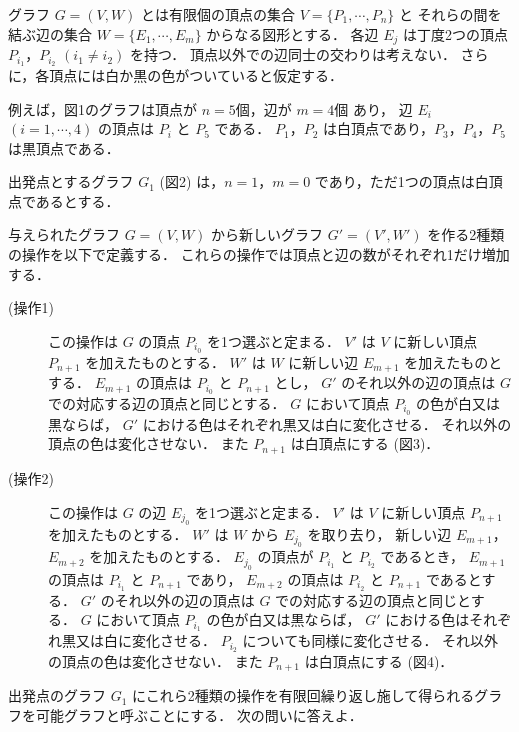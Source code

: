 \documentclass[../../main.tex]{subfiles}
\begin{document}
グラフ $G=(V,W)$ とは有限個の頂点の集合 $V=\{P_1,\cdots,P_n\}$ と
それらの間を結ぶ辺の集合 $W=\{E_1,\cdots,E_m\}$ からなる図形とする．
各辺 $E_j$ は丁度2つの頂点 $P_{i_1}$，$P_{i_2}$ $(i_1 \neq i_2)$ を持つ．
頂点以外での辺同士の交わりは考えない．
さらに，各頂点には白か黒の色がついていると仮定する．

例えば，図1のグラフは頂点が $n=5\text{個}$，辺が $m=4\text{個}$ あり，
辺 $E_i$ $(i=1,\cdots,4)$ の頂点は $P_i$ と $P_5$ である．
$P_1$，$P_2$ は白頂点であり，$P_3$，$P_4$，$P_5$ は黒頂点である．

出発点とするグラフ $G_1$ (図2) は，$n=1$，$m=0$ であり，ただ1つの頂点は白頂点であるとする．

与えられたグラフ $G=(V,W)$ から新しいグラフ $G'=(V',W')$ を作る2種類の操作を以下で定義する．
これらの操作では頂点と辺の数がそれぞれ1だけ増加する．

\begin{description}
  \item[(操作1)] この操作は $G$ の頂点 $P_{i_0}$ を1つ選ぶと定まる．
    $V'$ は $V$ に新しい頂点 $P_{n+1}$ を加えたものとする．
    $W'$ は $W$ に新しい辺 $E_{m+1}$ を加えたものとする．
    $E_{m+1}$ の頂点は $P_{i_0}$ と $P_{n+1}$ とし，
    $G'$ のそれ以外の辺の頂点は $G$ での対応する辺の頂点と同じとする．
    $G$ において頂点 $P_{i_0}$ の色が白又は黒ならば，
    $G'$ における色はそれぞれ黒又は白に変化させる．
    それ以外の頂点の色は変化させない．
    また $P_{n+1}$ は白頂点にする (図3)．

  \item[(操作2)] この操作は $G$ の辺 $E_{j_0}$ を1つ選ぶと定まる．
    $V'$ は $V$ に新しい頂点 $P_{n+1}$ を加えたものとする．
    $W'$ は $W$ から $E_{j_0}$ を取り去り，
    新しい辺 $E_{m+1}$，$E_{m+2}$ を加えたものとする．
    $E_{j_0}$ の頂点が $P_{i_1}$ と $P_{i_2}$ であるとき，
    $E_{m+1}$ の頂点は $P_{i_1}$ と $P_{n+1}$ であり，
    $E_{m+2}$ の頂点は $P_{i_2}$ と $P_{n+1}$ であるとする．
    $G'$ のそれ以外の辺の頂点は $G$ での対応する辺の頂点と同じとする．
    $G$ において頂点 $P_{i_1}$ の色が白又は黒ならば，
    $G'$ における色はそれぞれ黒又は白に変化させる．
    $P_{i_2}$ についても同様に変化させる．
    それ以外の頂点の色は変化させない．
    また $P_{n+1}$ は白頂点にする (図4)．
\end{description}

出発点のグラフ $G_1$ にこれら2種類の操作を有限回繰り返し施して得られるグラフを可能グラフと呼ぶことにする．
次の問いに答えよ．
\end{document}
